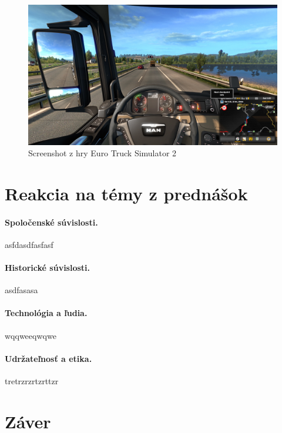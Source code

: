 \documentclass[10pt,oneside,slovak,a4paper]{article}
\begin{document}
\begin{figure}[h]
\centering
\includegraphics[scale=0.15]{ets.jpg}
\caption{Screenshot z hry Euro Truck Simulator 2}
\label{f:ets2}
\end{figure}

\section{Reakcia na témy z prednášok} \label{reakcia}

\paragraph{Spoločenské súvislosti.}

asfdasdfasfasf

\paragraph{Historické súvislosti.}

asdfasasa

\paragraph{Technológia a ľudia.}

wqqweeqwqwe

\paragraph{Udržateľnosť a etika.}

tretrzrzrtzrttzr

\section{Záver} \label{zaver}
\end{document}
